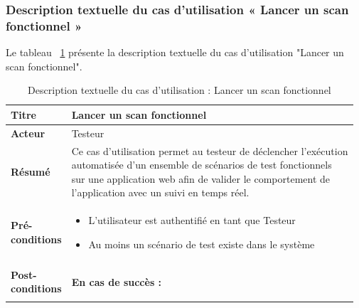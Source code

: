     \subsubsection{Description textuelle du cas d'utilisation « Lancer un scan fonctionnel »}
        Le tableau ~\ref{tab:descScanFonctionnel} présente la description textuelle du cas d'utilisation "Lancer un scan fonctionnel".
                \begin{spacing}{1}
                    \begin{longtable}{|p{0.12\linewidth}|p{0.85\linewidth}|}
                        \caption{Description textuelle du cas d'utilisation : Lancer un scan fonctionnel}
                        \label{tab:descScanFonctionnel}\\
                        \hline
                        \textbf{Titre} & Lancer un scan fonctionnel \\
                        \hline
                        \textbf{Acteur} & Testeur \\
                        \hline
                        \textbf{Résumé} & Ce cas d'utilisation permet au testeur de déclencher l'exécution automatisée d'un ensemble de scénarios de test fonctionnels sur une application web afin de valider le comportement de l'application avec un suivi en temps réel. \\
                        \hline
                        \textbf{Pré-conditions} & 
                        \begin{minipage}{0.83\textwidth}
                             \vspace{0.05cm}
                            \begin{itemize}[left=0cm]
                                \item[\textbullet] L'utilisateur est authentifié en tant que Testeur
                                \item[\textbullet] Au moins un scénario de test existe dans le système
                            \end{itemize}
                        \end{minipage} \\
                        \hline
                        \textbf{Post-conditions} & 
                        \begin{minipage}{0.83\textwidth}
                            \vspace{0.1cm}
                            \textbf{En cas de succès :}
                            \begin{itemize}[left=0cm]

\end{itemize}
\end{minipage}
\end{longtable}
\end{spacing}
